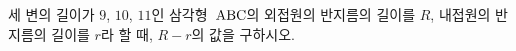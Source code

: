 세 변의 길이가 $9$, $10$, $11$인 삼각형~$\mathrm{ABC}$의 외접원의 반지름의 길이를 $R$, 내접원의 반지름의 길이를 $r$라 할 때, $R-r$의 값을 구하시오.
